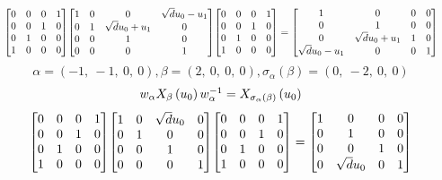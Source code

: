 \documentclass[11pt]{article}
\theoremstyle{definition}
\begin{document}
\[
\scaletoalign{\textwidth}{{\left[\begin{matrix}0 & 0 & 0 & 1\\0 & 0 & 1 & 0\\0 & 1 & 0 & 0\\1 & 0 & 0 & 0\end{matrix}\right]} {\left[\begin{matrix}1 & 0 & 0 & \sqrt{d} u_{0} - u_{1}\\0 & 1 & \sqrt{d} u_{0} + u_{1} & 0\\0 & 0 & 1 & 0\\0 & 0 & 0 & 1\end{matrix}\right]} {\left[\begin{matrix}0 & 0 & 0 & 1\\0 & 0 & 1 & 0\\0 & 1 & 0 & 0\\1 & 0 & 0 & 0\end{matrix}\right]} = {\left[\begin{matrix}1 & 0 & 0 & 0\\0 & 1 & 0 & 0\\0 & \sqrt{d} u_{0} + u_{1} & 1 & 0\\\sqrt{d} u_{0} - u_{1} & 0 & 0 & 1\end{matrix}\right]}}
\]
\[
\alpha = \left( -1, \  -1, \  0, \  0\right), \beta = \left( 2, \  0, \  0, \  0\right), \sigma_{\alpha}(\beta) = \left( 0, \  -2, \  0, \  0\right)
\]
\[
\scaletoalign{\textwidth}{w_{\alpha} X_{\beta}\left(u_{0}\right) w_{\alpha}^{-1} = X_{\sigma_{\alpha}\left(\beta\right)}\left(u_{0}\right)}
\]
\[
\scaletoalign{\textwidth}{{\left[\begin{matrix}0 & 0 & 0 & 1\\0 & 0 & 1 & 0\\0 & 1 & 0 & 0\\1 & 0 & 0 & 0\end{matrix}\right]} {\left[\begin{matrix}1 & 0 & \sqrt{d} u_{0} & 0\\0 & 1 & 0 & 0\\0 & 0 & 1 & 0\\0 & 0 & 0 & 1\end{matrix}\right]} {\left[\begin{matrix}0 & 0 & 0 & 1\\0 & 0 & 1 & 0\\0 & 1 & 0 & 0\\1 & 0 & 0 & 0\end{matrix}\right]} = {\left[\begin{matrix}1 & 0 & 0 & 0\\0 & 1 & 0 & 0\\0 & 0 & 1 & 0\\0 & \sqrt{d} u_{0} & 0 & 1\end{matrix}\right]}}
\]
\end{document}
